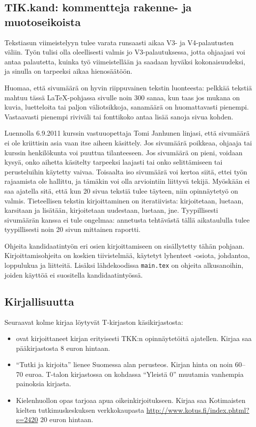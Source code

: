\subsection{TIK.kand: kommentteja rakenne- ja muotoseikoista}

Tekstiasun viimeistelyyn tulee varata runsaasti aikaa V3- ja
V4-palautusten väliin. Työn tulisi olla oleellisesti valmis jo
V3-palautuksessa, jotta ohjaajasi voi antaa palautetta, kuinka työ
viimeistellään ja saadaan hyväksi kokonaisuudeksi, ja sinulla on 
tarpeeksi aikaa hienosäätöön.

Huomaa, että sivumäärä on hyvin riippuvainen tekstin luonteesta:
pelkkää tekstiä mahtuu tässä \LaTeX{}-pohjassa sivulle noin 300 sanaa,
kun taas jos mukana on kuvia, luetteloita tai paljon väliotsikkoja,
sanamäärä on huomattavasti pienempi. Vastaavasti pienempi riviväli tai
fonttikoko antaa lisää sanoja sivua kohden.

Luennolla 6.9.2011 kurssin vastuuopettaja Tomi Janhunen linjasi, että
sivumäärä ei ole kriittisin asia vaan itse aiheen käsittely.  Jos
sivumäärä poikkeaa, ohjaaja tai kurssin henkilökunta voi puuttua
tilanteeseen. Jos sivumäärä on pieni, voidaan kysyä, onko aihetta
käsitelty tarpeeksi laajasti tai onko selittämiseen tai perusteluihin
käytetty vaivaa. Toisaalta iso sivumäärä voi kertoa siitä, ettei työn
rajaamista ole hallittu, ja tämäkin voi olla arviointiin liittyvä
tekijä. Myöskään ei saa ajatella sitä, että kun 20 sivua tekstiä tulee
täyteen, niin opinnäytetyö on valmis. Tieteellisen tekstin
kirjoittaminen on iteratiivista: kirjoitetaan, luetaan, karsitaan ja
lisätään, kirjoitetaan uudestaan, luetaan, jne. Tyypillisesti
sivumäärän kanssa ei tule ongelmaa: annetusta tehtävästä tällä
aikataululla tulee tyypillisesti noin 20 sivun mittainen raportti.

Ohjeita kandidaatintyön eri osien kirjoittamiseen on sisällytetty
tähän pohjaan. Kirjoittamisohjeita on koskien tiivistelmää, käytetyt
lyhenteet -osiota, johdantoa, loppulukua ja liitteitä.  Lisäksi
lähdekoodissa \verb!main.tex! on ohjeita alkusanoihin, joiden käyttöä
ei suositella kandidaatintyössä.

\subsection{Kirjallisuutta}

Seuraavat kolme kirjaa löytyvät T-kirjaston käsikirjastosta:
%
\begin{itemize}
\item \cite{kauranen2006} ovat kirjoittaneet kirjan erityisesti TKK:n
  opinnäytetöitä ajatellen.  Kirjaa saa pääkirjastosta 8 euron
  hintaan.
%
\item ``Tutki ja kirjoita'' \citep{hirsjarvi2009} lienee Suomessa alan
  perusteos.  Kirjan hinta on noin 60--70 euroa.  T-talon kirjastossa
  on kohdassa ``Yleistä 0'' muutamia vanhempia painoksia kirjasta.
%
\item Kielenhuollon opas \citep{oikeinkirjoitus2010} tarjoaa apua
  oikeinkirjoitukseen. Kirjaa saa Kotimaisten kielten
  tutkimuskeskuksen verkkokaupasta
  \url{http://www.kotus.fi/index.phtml?s=2420} 20 euron hintaan.
\end{itemize}

